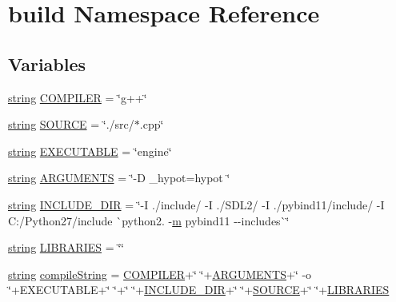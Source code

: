 \hypertarget{namespacebuild}{}\section{build Namespace Reference}
\label{namespacebuild}
\subsection*{Variables}
\begin{DoxyCompactItemize}
\item 
\mbox{\hyperlink{asdl_8h_ae84541b4f3d8e1ea24ec0f466a8c568b}{string}} \mbox{\hyperlink{namespacebuild_aa75f224fbf929d8e46d1d31968ee6451}{C\+O\+M\+P\+I\+L\+ER}} = \char`\"{}g++\char`\"{}
\item 
\mbox{\hyperlink{asdl_8h_ae84541b4f3d8e1ea24ec0f466a8c568b}{string}} \mbox{\hyperlink{namespacebuild_a832e50b60ae1bc20032caf0540c2176b}{S\+O\+U\+R\+CE}} = \char`\"{}./src/$\ast$.cpp\char`\"{}
\item 
\mbox{\hyperlink{asdl_8h_ae84541b4f3d8e1ea24ec0f466a8c568b}{string}} \mbox{\hyperlink{namespacebuild_ad848a55f54f2234a8c862b0c3597ac1b}{E\+X\+E\+C\+U\+T\+A\+B\+LE}} = \char`\"{}engine\char`\"{}
\item 
\mbox{\hyperlink{asdl_8h_ae84541b4f3d8e1ea24ec0f466a8c568b}{string}} \mbox{\hyperlink{namespacebuild_a22a020f532c8c3f6e670601012eef5eb}{A\+R\+G\+U\+M\+E\+N\+TS}} = \char`\"{}-\/D \+\_\+hypot=hypot \char`\"{}
\item 
\mbox{\hyperlink{asdl_8h_ae84541b4f3d8e1ea24ec0f466a8c568b}{string}} \mbox{\hyperlink{namespacebuild_af7dbc41885851b81d2588a14a5523d92}{I\+N\+C\+L\+U\+D\+E\+\_\+\+D\+IR}} = \char`\"{}-\/I ./include/ -\/I ./S\+D\+L2/ -\/I ./pybind11/include/ -\/I C\+:/Python27/include \`{}python2. -\/\mbox{\hyperlink{_s_d_l__opengl__glext_8h_af593500c283bf1a787a6f947f503a5c2}{m}} pybind11 -\/-\/includes\`{}\char`\"{}
\item 
\mbox{\hyperlink{asdl_8h_ae84541b4f3d8e1ea24ec0f466a8c568b}{string}} \mbox{\hyperlink{namespacebuild_ac41b6d1c6acdf4c0ab8bdc6f6c2eabda}{L\+I\+B\+R\+A\+R\+I\+ES}} = \char`\"{}\char`\"{}
\item 
\mbox{\hyperlink{asdl_8h_ae84541b4f3d8e1ea24ec0f466a8c568b}{string}} \mbox{\hyperlink{namespacebuild_aad7d648a6e7eb1f6b36140a180580b24}{compile\+String}} = \mbox{\hyperlink{namespacebuild_aa75f224fbf929d8e46d1d31968ee6451}{C\+O\+M\+P\+I\+L\+ER}}+\char`\"{} \char`\"{}+\mbox{\hyperlink{namespacebuild_a22a020f532c8c3f6e670601012eef5eb}{A\+R\+G\+U\+M\+E\+N\+TS}}+\char`\"{} -\/o \char`\"{}+E\+X\+E\+C\+U\+T\+A\+B\+LE+\char`\"{} \char`\"{}+\char`\"{} \char`\"{}+\mbox{\hyperlink{namespacebuild_af7dbc41885851b81d2588a14a5523d92}{I\+N\+C\+L\+U\+D\+E\+\_\+\+D\+IR}}+\char`\"{} \char`\"{}+\mbox{\hyperlink{namespacebuild_a832e50b60ae1bc20032caf0540c2176b}{S\+O\+U\+R\+CE}}+\char`\"{} \char`\"{}+\mbox{\hyperlink{namespacebuild_ac41b6d1c6acdf4c0ab8bdc6f6c2eabda}{L\+I\+B\+R\+A\+R\+I\+ES}}
\end{DoxyCompactItemize}



